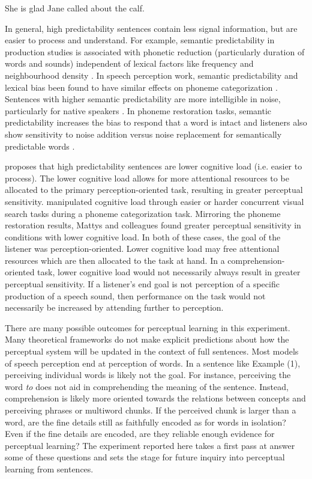 \ex[exno=2]
She is glad Jane called about the calf.
\xe


In general, high predictability sentences contain less signal information, but are easier to process and understand.
For example, semantic predictability in production studies is associated with phonetic reduction (particularly duration of words and sounds) independent of lexical factors like frequency and neighbourhood density \citep{Scarborough2010, Clopper2008}.  
In speech perception work, semantic predictability and lexical bias been found to have similar effects on phoneme categorization \citep{Connine1987,Borsky1998}.
Sentences with higher semantic predictability are more intelligible in noise, particularly for native speakers \citep[and others]{Kalikow1977, Mayo1997, Fallon2002, Bradlow2007}.
In phoneme restoration tasks, semantic predictability increases the bias to respond that a word is intact and listeners also show sensitivity to noise addition versus noise replacement for semantically predictable words \citep{Samuel1981}.

\citet{Samuel1981} proposes that high predictability sentences are lower cognitive load (i.e. easier to process).  
The lower cognitive load allows for more attentional resources to be allocated to the primary perception-oriented task, resulting in greater perceptual sensitivity.
\citet{Mattys2011} manipulated cognitive load through easier or harder concurrent visual search tasks during a phoneme categorization task.
Mirroring the phoneme restoration results, Mattys and colleagues found greater perceptual sensitivity in conditions with lower cognitive load.
In both of these cases, the goal of the listener was perception-oriented.
Lower cognitive load may free attentional resources which are then allocated to the task at hand.
In a comprehension-oriented task, lower cognitive load would not necessarily always result in greater perceptual sensitivity. 
If a listener's end goal is not perception of a specific production of a speech sound, then performance on the task would not necessarily be increased by attending further to perception.


There are many possible outcomes for perceptual learning in this experiment.
Many theoretical frameworks do not make explicit predictions about how the perceptual system will be updated in the context of full sentences.
Most models of speech perception end at perception of words.
In a sentence like Example (1), perceiving individual words is likely not the goal.
For instance, perceiving the word \emph{to} does not aid in comprehending the meaning of the sentence.
Instead, comprehension is likely more oriented towards the relations between concepts and perceiving phrases or multiword chunks.
If the perceived chunk is larger than a word, are the fine details still as faithfully encoded as for words in isolation?
Even if the fine details are encoded, are they reliable enough evidence for perceptual learning?
The experiment reported here takes a first pass at answer some of these questions and sets the stage for future inquiry into perceptual learning from sentences. 

